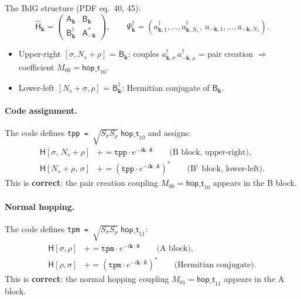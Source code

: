 \documentclass[11pt]{article}
\newcommand{\hop}{\mathsf{hop\_t}}
\newcommand{\Ns}{N_s}
\newcommand{\dg}{^\dagger}
\begin{document}
The BdG structure (PDF eq.~40, 45):
\begin{equation}
  \hat{\mathsf{H}}_\mathbf{k}
  = \begin{pmatrix}
    \mathsf{A}_\mathbf{k}  & \mathsf{B}_\mathbf{k} \\[2pt]
    \mathsf{B}\dg_\mathbf{k} & \mathsf{A}^*_{-\mathbf{k}}
  \end{pmatrix},
  \qquad
  \Psi\dg_\mathbf{k} = (a\dg_{\mathbf{k},1},\ldots,a\dg_{\mathbf{k},\Ns},\;
  a_{-\mathbf{k},1},\ldots,a_{-\mathbf{k},\Ns}).
\end{equation}

\begin{itemize}
\item Upper-right $[\sigma,\Ns+\rho]$ = $\mathsf{B}_\mathbf{k}$:
  couples $a\dg_{\mathbf{k},\sigma}\,a\dg_{-\mathbf{k},\rho}$
  = pair creation $\Rightarrow$ coefficient $M_{00} = \hop_{10}$.
\item Lower-left $[\Ns+\sigma,\rho]$ = $\mathsf{B}\dg_\mathbf{k}$:
  Hermitian conjugate of $\mathsf{B}_\mathbf{k}$.
\end{itemize}

\paragraph{Code assignment.}
The code defines \texttt{tpp = $\sqrt{S_\sigma S_\rho}\;\hop_{10}$}
and assigns:
\begin{align}
  \mathsf{H}[\sigma,\,\Ns{+}\rho]
  &\mathrel{+}= \texttt{tpp}\cdot e^{-i\mathbf{k}\cdot\bm{\delta}}
  \qquad\text{(B block, upper-right)},\\
  \mathsf{H}[\Ns{+}\rho,\,\sigma]
  &\mathrel{+}= (\texttt{tpp}\cdot e^{-i\mathbf{k}\cdot\bm{\delta}})^*
  \qquad\text{(B$\dg$ block, lower-left)}.
\end{align}
This is \textbf{correct}: the pair creation coupling $M_{00} = \hop_{10}$
appears in the B block.

\paragraph{Normal hopping.}
The code defines \texttt{tpm = $\sqrt{S_\sigma S_\rho}\;\hop_{11}$}:
\begin{align}
  \mathsf{H}[\sigma,\rho]
  &\mathrel{+}= \texttt{tpm}\cdot e^{-i\mathbf{k}\cdot\bm\delta}
  \qquad\text{(A block)},\\
  \mathsf{H}[\rho,\sigma]
  &\mathrel{+}= (\texttt{tpm}\cdot e^{-i\mathbf{k}\cdot\bm\delta})^*
  \qquad\text{(Hermitian conjugate)}.
\end{align}
This is \textbf{correct}: the normal hopping coupling $M_{01} = \hop_{11}$
appears in the A block.
\end{document}
